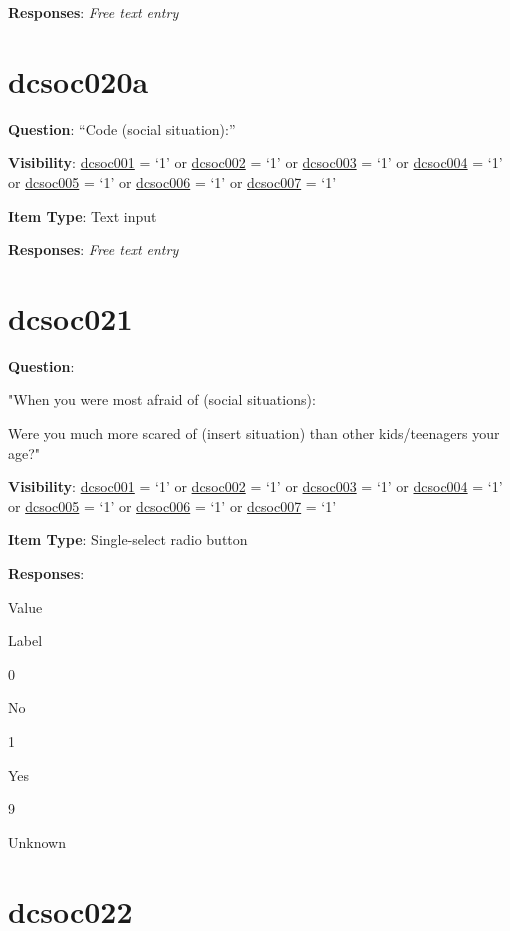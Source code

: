 \documentclass[]{book}
\begin{document}
\textbf{Responses}: \emph{Free text entry}

\hypertarget{dcsoc020a}{%
\section{dcsoc020a}\label{dcsoc020a}}

\textbf{Question}: ``Code (social situation):''

\textbf{Visibility}: \protect\hyperlink{dcsoc001}{dcsoc001} = `1' or \protect\hyperlink{dcsoc002}{dcsoc002} = `1' or \protect\hyperlink{dcsoc003}{dcsoc003} = `1' or \protect\hyperlink{dcsoc004}{dcsoc004} = `1' or \protect\hyperlink{dcsoc005}{dcsoc005} = `1' or \protect\hyperlink{dcsoc006}{dcsoc006} = `1' or \protect\hyperlink{dcsoc007}{dcsoc007} = `1'

\textbf{Item Type}: Text input

\textbf{Responses}: \emph{Free text entry}

\hypertarget{dcsoc021}{%
\section{dcsoc021}\label{dcsoc021}}

\textbf{Question}:

"When you were most afraid of (social situations):

Were you much more scared of (insert situation) than other kids/teenagers your age?"

\textbf{Visibility}: \protect\hyperlink{dcsoc001}{dcsoc001} = `1' or \protect\hyperlink{dcsoc002}{dcsoc002} = `1' or \protect\hyperlink{dcsoc003}{dcsoc003} = `1' or \protect\hyperlink{dcsoc004}{dcsoc004} = `1' or \protect\hyperlink{dcsoc005}{dcsoc005} = `1' or \protect\hyperlink{dcsoc006}{dcsoc006} = `1' or \protect\hyperlink{dcsoc007}{dcsoc007} = `1'

\textbf{Item Type}: Single-select radio button

\textbf{Responses}:

Value

Label

0

No

1

Yes

9

Unknown

\hypertarget{dcsoc022}{%
\section{dcsoc022}\label{dcsoc022}}
\end{document}
